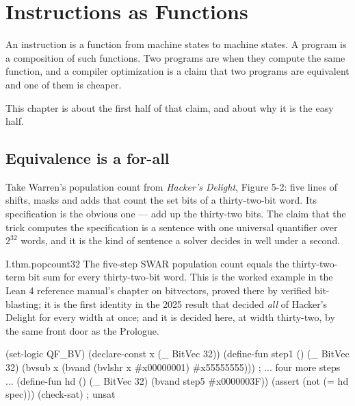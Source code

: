 \chapter{Instructions as Functions}
\label{ch:functions}

An instruction is a function from machine states to machine states. A program is a composition of such functions. Two programs are  when they compute the same function, and a compiler optimization is a claim that two programs are equivalent and one of them is cheaper.

This chapter is about the first half of that claim, and about why it is the easy half.

\section{Equivalence is a for-all}
\label{sec:equiv}

Take Warren's population count from \emph{Hacker's Delight}, Figure 5-2: five lines of shifts, masks and adds that count the set bits of a thirty-two-bit word. Its specification is the obvious one --- add up the thirty-two bits. The claim that the trick computes the specification is a sentence with one universal quantifier over \(2^{32}\) words, and it is the kind of sentence a solver decides in well under a second.

\begin{artifact}{I.thm.popcount32}
The five-step SWAR population count equals the thirty-two-term bit sum for every thirty-two-bit word. This is the worked example in the Lean 4 reference manual's chapter on bitvectors, proved there by verified bit-blasting; it is the first identity in the 2025 result that decided \emph{all} of Hacker's Delight for every width at once; and it is decided here, at width thirty-two, by the same front door as the Prologue.
\end{artifact}

\begin{codelisting}[language=Lisp,caption={The negated equivalence, as the solver sees it. The specification is the thirty-two-term sum; the theorem is that the difference has no model.}]
(set-logic QF_BV)
(declare-const x (_ BitVec 32))
(define-fun step1 () (_ BitVec 32)
  (bvsub x (bvand (bvlshr x #x00000001) #x55555555)))
; ... four more steps ...
(define-fun hd () (_ BitVec 32) (bvand step5 #x0000003F))
(assert (not (= hd spec)))
(check-sat)          ; unsat
\end{codelisting}

